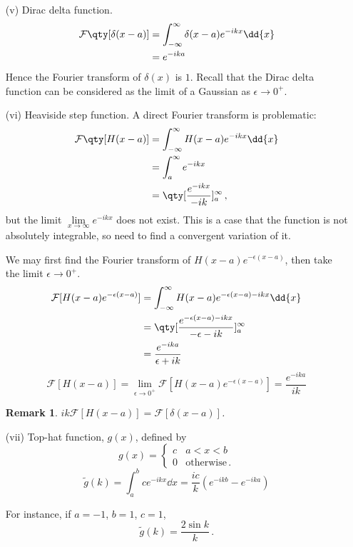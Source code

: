 \documentclass{article}
\theoremstyle{plain}\theoremheaderfont{\normalfont\itshape}\theorembodyfont{\rmfamily}\theoremseparator{.}\newtheorem*{rem}{Remark}\newtheorem*{ex}{Example}\newtheorem*{proof}{Proof}\newtheorem*{altp}{Alternative proof}
\theoremstyle{plain}\theoremheaderfont{\normalfont\bfseries}\theorembodyfont{\rmfamily}\theoremseparator{.}\newtheorem{thm}{Theorem}[section]\newtheorem{lem}[thm]{Lemma}\newtheorem{prop}[thm]{Proposition}\newtheorem*{cor}{Corollary}\newtheorem{defn}[thm]{Definition}\newtheorem{clm}[thm]{Claim}\newtheorem{clminproof}{Claim}
\theoremstyle{break}\theoremheaderfont{\normalfont\itshape}\theorembodyfont{\rmfamily}\theoremseparator{.\medskip}\newtheorem*{proofskip}{Proof}\newtheorem*{exs}{Examples}\newtheorem*{rems}{Remarks}
\theoremstyle{break}\theoremheaderfont{\normalfont\bfseries}\theorembodyfont{\rmfamily}\theoremseparator{.\medskip}\newtheorem{lemskip}[thm]{Lemma}\newtheorem{defnskip}[thm]{Definition}\newtheorem{propskip}[thm]{Proposition}\newtheorem{thmskip}[thm]{Theorem}
\numberwithin{equation}{section}
\begin{document}
\begin{itemize}
		\item[(v)] Dirac delta function.
		\begin{align*}
			\mathcal{F}\qty[\delta(x-a)]&=\int_{-\infty}^{\infty}\delta(x-a)e^{-ikx}\dd{x}\\
			&=e^{-ika}			
		\end{align*}
		Hence the Fourier transform of \(\delta(x)\) is \(1\). Recall that the Dirac delta function can be considered as the limit of a Gaussian as \(\epsilon\to 0^+\).
		
		\item[(vi)] Heaviside step function. A direct Fourier transform is problematic:
		\begin{align*}
			\mathcal{F}\qty[H(x-a)]&=\int_{-\infty}^{\infty}H(x-a)e^{-ikx}\dd{x}\\
			&=\int_{a}^{\infty}e^{-ikx}\\
			&=\qty[\frac{e^{-ikx}}{-ik}]_{a}^{\infty}\,,
		\end{align*}
		but the limit \(\lim\limits_{x\to\infty}e^{-ikx}\) does not exist. This is a case that the function is not absolutely integrable, so need to find a convergent variation of it.
		
		We may first find the Fourier transform of \(H(x-a)e^{-\epsilon(x-a)}\), then take the limit \(\epsilon\to 0^+\).
		\begin{align*}
			\mathcal{F}[H(x-a)e^{-\epsilon(x-a)}]&=\int_{-\infty}^{\infty}H(x-a)e^{-\epsilon(x-a)-ikx}\dd{x}\\
			&=\qty[\frac{e^{-\epsilon(x-a)-ikx}}{-\epsilon-ik}]_a^\infty\\
			&=\frac{e^{-ika}}{\epsilon+ik}
		\end{align*}
		\[\mathcal{F}[H(x-a)]=\lim_{\epsilon\to 0^+}\mathcal{F}[H(x-a)e^{-\epsilon(x-a)}]=\frac{e^{-ika}}{ik}\]
		\begin{rem}
			\(ik\mathcal{F}[H(x-a)]=\mathcal{F}[\delta(x-a)]\).
		\end{rem}

		\item[(vii)] Top-hat function, \(g(x)\), defined by
		\[g(x)=\begin{cases}
			c & a<x<b\\
			0 & \text{otherwise}\,.
		\end{cases}\]
		\[\tilde{g}(k)=\int_{a}^{b}ce^{-ikx}\dd{x}=\frac{ic}{k}(e^{-ikb}-e^{-ika})\]
		
		For instance, if \(a=-1\), \(b=1\), \(c=1\),
		\[\tilde{g}(k)=\frac{2\sin k}{k}\,.\]
	\end{itemize}
	
\end{document}
